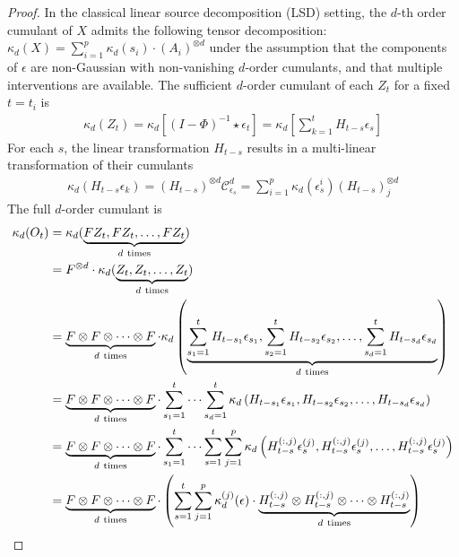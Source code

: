 \documentclass[10pt]{article}
\numberwithin{figure}{section}
\begin{document}
\begin{proof}
In the classical linear source decomposition (LSD) setting, the $d$-th order cumulant of $X$ admits the following tensor decomposition: $\kappa_d(X) = \sum_{i=1}^{p} \kappa_d(s_i) \cdot (A_i)^{\otimes d}$ under the assumption that the components of $\epsilon$ are non-Gaussian with non-vanishing $d$-order cumulants, and that multiple interventions are available.  The sufficient $d$-order cumulant of each $Z_t$ for a fixed $t=t_i$ is
\begin{align*}
    \kappa_d (Z_t) =   \kappa_d [(I-\Phi)^{-1}\star \epsilon_t]= \kappa_d [\sum\limits_{k=1}^{t}H_{t-s}\epsilon_s]
\end{align*}
For each $s$, the linear transformation $H_{t-s}$  results in a multi-linear transformation of their cumulants
\begin{align*}
    \kappa_d(H_{t-s}\epsilon_k)= (H_{t-s})^{\otimes d}\mathcal{C}_{\epsilon_s}^{d}=\sum\limits_{i=1}^{p}\kappa_d(\epsilon_s^{i})(H_{t-s})_j^{\otimes d}
\end{align*}
The full $d$-order cumulant is
\begin{align}
    \kappa_d(O_t)
    &= \kappa_d(\underbrace{F Z_t, F Z_t, \ldots, F Z_t}_{d~\text{times}}) \notag\\
    & = F^{\otimes d} \cdot \kappa_d(\underbrace{Z_t, Z_t, \ldots, Z_t}_{d~\text{times}}) \\
    &= \underbrace{F \otimes F \otimes \cdots \otimes F}_{d~\text{times}}\cdot \kappa_d\left(\underbrace{\sum\limits_{s_1=1}^{t} H_{t-s_1} \epsilon_{s_1},  \sum\limits_{s_2=1}^{t} H_{t-s_2} \epsilon_{s_2}, \ldots, \sum\limits_{s_d=1}^{t} H_{t-s_d} \epsilon_{s_d}}_{d~\text{times}} \right) \notag\\
    &= \underbrace{F \otimes F \otimes \cdots \otimes F}_{d~\text{times}} \cdot \sum\limits_{s_1=1}^{t} \cdots \sum\limits_{s_d=1}^{t} \kappa_d\left( H_{t-s_1} \epsilon_{s_1}, H_{t-s_2} \epsilon_{s_2}, \ldots, H_{t-s_d} \epsilon_{s_d} \right) \notag\\
    &= \underbrace{F \otimes F \otimes \cdots \otimes F}_{d~\text{times}} \cdot \sum\limits_{s_1=1}^{t} \cdots \sum\limits_{s=1}^{t} \sum\limits_{j=1}^{p} \kappa_d\left(  H_{t-s}^{(:,j)} \epsilon_{s}^{(j)}, H_{t-s}^{(:,j)} \epsilon_{s}^{(j)}, \ldots, H_{t-s}^{(:,j)} \epsilon_{s}^{(j)} \right) \notag\\
     &= \underbrace{F \otimes F \otimes \cdots \otimes F}_{d~\text{times}} \cdot \left( \sum_{s=1}^{t} \sum_{j=1}^{p} \kappa_d^{(j)}(\epsilon) \cdot \underbrace{H_{t-s}^{(:,j)} \otimes H_{t-s}^{(:,j)} \otimes \cdots \otimes H_{t-s}^{(:,j)}}_{d~\text{times}} \right) \notag\\

\end{align}
\end{proof}
\end{document}

